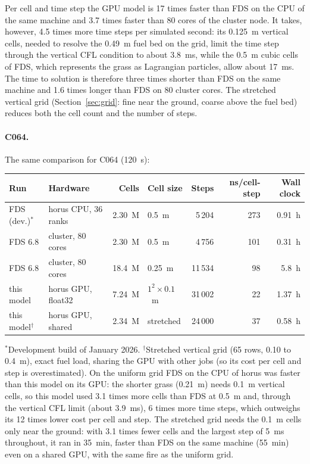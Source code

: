 \documentclass[11pt,a4paper]{article}
\begin{document}
Per cell and time step the GPU model is 17 times faster than FDS on the CPU of the same machine and 3.7 times
faster than 80 cores of the cluster node. It takes, however, 4.5 times more time steps per simulated second:
its 0.125~m vertical cells, needed to resolve the 0.49~m fuel bed on the grid, limit the time step through the
vertical CFL condition to about 3.8~ms, while the 0.5~m cubic cells of FDS, which represents the grass as
Lagrangian particles, allow about 17~ms. The time to solution is therefore three times shorter than FDS on
the same machine and 1.6 times longer than FDS on 80 cluster cores. The stretched vertical grid
(Section~\ref{sec:grid}: fine near the ground, coarse above the fuel bed) reduces both the cell count and the
number of steps.

\paragraph{C064.} The same comparison for C064 (120~s):
\begin{center}
\small
\begin{tabular}{llrlrrr}
\toprule
Run & Hardware & Cells & Cell size & Steps & ns/cell-step & Wall clock \\
\midrule
FDS (dev.)$^*$ & horus CPU, 36 ranks & 2.30~M & 0.5~m & 5\,204 & 273 & 0.91~h \\
FDS 6.8 & cluster, 80 cores & 2.30~M & 0.5~m & 4\,756 & 101 & 0.31~h \\
FDS 6.8 & cluster, 80 cores & 18.4~M & 0.25~m & 11\,534 & 98 & 5.8~h \\
this model & horus GPU, float32 & 7.24~M & $1^2\times0.1$~m & 31\,002 & 22 & 1.37~h \\
this model$^\dagger$ & horus GPU, shared & 2.34~M & stretched & 24\,000 & 37 & 0.58~h \\
\bottomrule
\end{tabular}
\end{center}
$^*$Development build of January 2026. $^\dagger$Stretched vertical grid (65 rows, 0.10 to 0.4~m), exact fuel
load, sharing the GPU with other jobs (so its cost per cell and step is overestimated). On the uniform grid
FDS on the CPU of horus was faster than this model on its GPU: the shorter grass (0.21~m) needs 0.1~m
vertical cells, so this model used 3.1 times more cells than FDS at 0.5~m and, through the vertical CFL limit
(about 3.9~ms), 6 times more time steps, which outweighs its 12 times lower cost per cell and step. The
stretched grid needs the 0.1~m cells only near the ground: with 3.1 times fewer cells and the largest step of
5~ms throughout, it ran in 35~min, faster than FDS on the same machine (55~min) even on a shared GPU, with
the same fire as the uniform grid.
\end{document}
